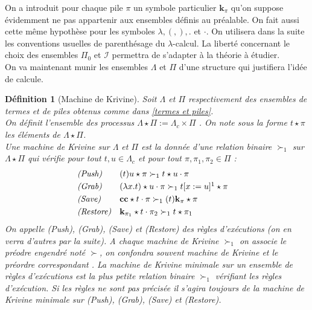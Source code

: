 \documentclass[a4paper,12pt]{article}
\newtheorem{defi}[theo]{Définition}
\theoremstyle{rmqstyle}
\newcommand{\cc}{\mathbf{cc}}
\renewcommand{\k}{\mathbf{k}}
\begin{document}
On a introduit pour chaque pile $\pi$ un symbole particulier $\k_\pi$ qu'on suppose évidemment ne pas appartenir aux ensembles définis au préalable. On fait aussi cette même hypothèse pour les symboles $\lambda, (,),.$ et $\cdot$. On utilisera dans la suite les conventions usuelles de parenthésage du $\lambda$-calcul. La liberté concernant le choix des ensembles $\Pi_0$ et $\mathcal{I}$ permettra de s'adapter à la théorie à étudier.\\

On va maintenant munir les ensembles $\Lambda$ et $\Pi$ d'une structure qui justifiera l'idée de calcule. 

\begin{defi}[Machine de Krivine]
Soit $\Lambda$ et $\Pi$ respectivement des ensembles de termes et de piles obtenus comme dans \ref{termes et piles}.\\
On définit l'ensemble des processus $\Lambda \star \Pi := \Lambda_c \times \Pi$ . On note sous la forme $t \star \pi$ les éléments de $\Lambda \star \Pi$.\\
Une machine de Krivine sur $\Lambda$ et $\Pi$ est la donnée d'une relation binaire $\succ_1$ sur $\Lambda \star \Pi$ qui vérifie pour tout $t,u \in \Lambda_c$ et pour tout $\pi, \pi_1, \pi_2 \in \Pi$ : 
\begin{align*}
&\textit{(Push)}& &(t)u \star \pi \succ_1 t \star u \cdot \pi&\\
&\textit{(Grab)}& &(\lambda x. t) \star u \cdot \pi \succ_1 t[x := u]\footnotemark \star \pi&\\
&\textit{(Save)}& &\cc \star t \cdot \pi \succ_1 (t) \k_\pi \star \pi&\\
&\textit{(Restore)}& &\k_{\pi_1} \star t \cdot \pi_2 \succ_1 t \star \pi_1&
\end{align*}
On appelle \textit{(Push)}, \textit{(Grab)}, \textit{(Save)} et \textit{(Restore)} des règles d'exécutions (on en verra d'autres par la suite). A chaque machine de Krivine $\succ_1$ on associe le préodre engendré noté $\succ$, on confondra souvent machine de Krivine et le préordre correspondant . La machine de Krivine minimale sur un ensemble de règles d'exécutions est la plus petite relation binaire $\succ_1$ vérifiant les règles d'exécution. Si les règles ne sont pas précisée il s'agira toujours de la machine de Krivine minimale sur \textit{(Push)}, \textit{(Grab)}, \textit{(Save)} et \textit{(Restore)}.
\end{defi}
\end{document}
